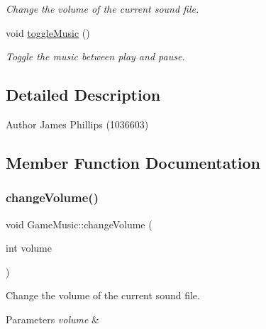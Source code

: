 \begin{DoxyCompactItemize}
\begin{DoxyCompactList}\small\item\em Change the volume of the current sound file. \end{DoxyCompactList}\item 
\mbox{\label{class_game_music_ac14197e5734c1934ca85666c14a7a1c3}} 
void \hyperlink{class_game_music_ac14197e5734c1934ca85666c14a7a1c3}{toggle\+Music} ()
\begin{DoxyCompactList}\small\item\em Toggle the music between play and pause. \end{DoxyCompactList}\end{DoxyCompactItemize}


\subsection{Detailed Description}
\begin{DoxyAuthor}{Author}
James Phillips (1036603) 
\end{DoxyAuthor}


\subsection{Member Function Documentation}
\mbox{\label{class_game_music_adafedd8d8c1b98efbac108c8f8b826ac}} 
\subsubsection{\texorpdfstring{change\+Volume()}{changeVolume()}}
{\footnotesize\ttfamily void Game\+Music\+::change\+Volume (\begin{DoxyParamCaption}\item[{int}]{volume }\end{DoxyParamCaption})}



Change the volume of the current sound file. 


\begin{DoxyParams}{Parameters}
{\em volume} & \\
\hline
\end{DoxyParams}
\mbox{\label{class_game_music_a47a770430dc1213a4b31ab0353549018}} 
